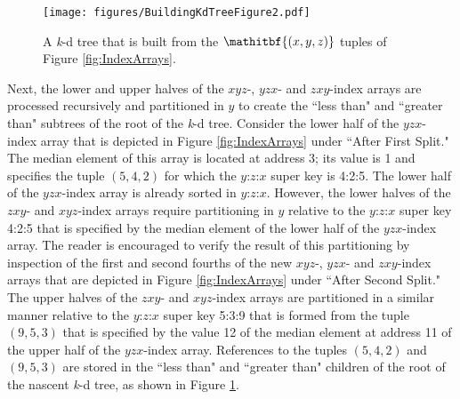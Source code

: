 \documentclass{sig-alternate}
\begin{document}
\begin{figure}[h]
\centering
\centerline{\texttt{[image: figures/BuildingKdTreeFigure2.pdf]}}
\caption{A \emph{k}-d tree that is built from the $\mathitbf{\left(x,y,z\right)}$ tuples of Figure  \ref{fig:IndexArrays}.}
\label{fig:FinalTree}
\end{figure}

Next, the lower and upper halves of the $xyz$-, $yzx$- and $zxy$-index arrays are processed recursively and partitioned in $y$ to create the ``less than" and ``greater than" subtrees of the root of the \emph{k}-d tree.  Consider the lower half of the $yzx$-index array that is depicted in Figure \ref{fig:IndexArrays} under ``After First Split."  The median element of this array is located at address 3; its value is 1 and specifies the tuple $\left(5,4,2\right)$ for which the $y$:$z$:$x$ super key is 4:2:5.  The lower half of the $yzx$-index array is already sorted in $y$:$z$:$x$.  However, the lower halves of the $zxy$- and $xyz$-index arrays require partitioning in $y$ relative to the $y$:$z$:$x$ super key 4:2:5 that is specified by the median element of the lower half of the $yzx$-index array.  The reader is encouraged to verify the result of this partitioning by inspection of the first and second fourths of the new $xyz$-, $yzx$- and $zxy$-index arrays that are depicted in Figure \ref{fig:IndexArrays} under ``After Second Split."  The upper halves of the $zxy$- and $xyz$-index arrays are partitioned in a similar manner relative to the $y$:$z$:$x$ super key 5:3:9 that is formed from the tuple $\left(9,5,3\right)$ that is specified by the value 12 of the median element at address 11 of the upper half of the $yzx$-index array.  References to the tuples $\left(5,4,2\right)$ and $\left(9,5,3\right)$ are stored in the ``less than" and ``greater than" children of the root of the nascent \emph{k}-d tree, as shown in Figure \ref{fig:FinalTree}.
\end{document}
